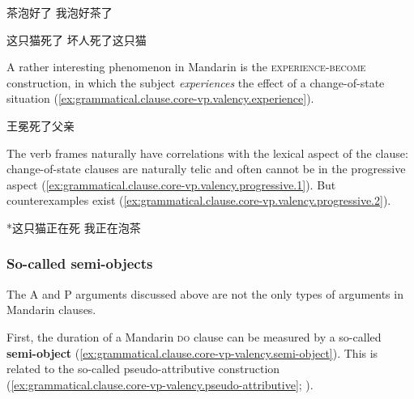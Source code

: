 \documentclass[UTF8, a4paper, oneside, scheme=plain, 12pt]{ctexrep}
\newcommand*{\concept}[1]{\textbf{#1}}
\newcommand*{\category}[1]{\textsc{#1}}
\begin{document}
\begin{exe}
    \ex\label{ex:grammatical.clause.core-vp.valency.become} \begin{xlist}
        \ex\label{ex:grammatical.clause.core-vp.valency.become.1} 茶泡好了
        \ex 我泡好茶了
    \end{xlist}

    \ex\label{ex:grammatical.clause.core-vp.valency.become-only}
    \begin{xlist}
        \ex\label{ex:grammatical.clause.core-vp.valency.become-only.1} 这只猫死了
        \ex *坏人死了这只猫
    \end{xlist}
\end{exe}

A rather interesting phenomenon in Mandarin is the \category{experience}-\category{become} construction,
in which the subject \emph{experiences} the effect of a change-of-state situation
(\ref{ex:grammatical.clause.core-vp.valency.experience}).

\begin{exe}
    \ex\label{ex:grammatical.clause.core-vp.valency.experience}
    \begin{xlist}
        \ex 王冕死了父亲
    \end{xlist}
\end{exe}

The verb frames naturally have correlations with the lexical aspect of the clause:
change-of-state clauses are naturally telic and often cannot be in the progressive aspect
(\ref{ex:grammatical.clause.core-vp.valency.progressive.1}).
But counterexamples exist
(\ref{ex:grammatical.clause.core-vp.valency.progressive.2}).

\begin{exe}
    \ex\label{ex:grammatical.clause.core-vp.valency.progressive.1} *这只猫正在死
    \ex\label{ex:grammatical.clause.core-vp.valency.progressive.2} 我正在泡茶
\end{exe}

\subsubsection{So-called semi-objects}

The A and P arguments discussed above are not the only types of arguments in Mandarin clauses.

First, the duration of a Mandarin \category{do} clause
can be measured by a so-called \concept{semi-object}
(\ref{ex:grammatical.clause.core-vp-valency.semi-object}).
This is related to the so-called pseudo-attributive construction
(\ref{ex:grammatical.clause.core-vp-valency.pseudo-attributive};
).
\end{document}
